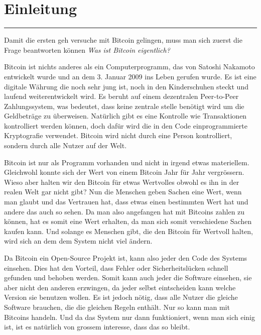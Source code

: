 \vspace*{1mm}
\section*{Einleitung}
\vspace{-10mm}
\noindent\rule{0.8\textwidth}{0.4pt}

\vspace{5mm}

\noindent
Damit die ersten geh versuche mit Bitcoin gelingen, muss man sich zuerst die Frage beantworten können \emph{\dq Was ist Bitcoin eigentlich? \dq}

\noindent
Bitcoin ist nichts anderes als ein Computerprogramm, das von Satoshi Nakamoto entwickelt wurde und an dem 3. Januar 2009 ins Leben gerufen wurde.
Es ist eine digitale Währung die noch sehr jung ist, noch in den Kinderschuhen steckt und laufend weiterentwickelt wird.
Es beruht auf einem dezentralen Peer-to-Peer Zahlungssystem, was bedeutet, dass keine zentrale stelle benötigt wird um die Geldbeträge zu überweisen.
Natürlich gibt es eine Kontrolle wie Transaktionen kontrolliert werden können, doch dafür wird die in den Code einprogrammierte Kryptografie verwendet.
Bitcoin wird nicht durch eine Person kontrolliert, sondern durch alle Nutzer auf der Welt.

\noindent
Bitcoin ist nur als Programm vorhanden und nicht in irgend etwas materiellem. Gleichwohl konnte sich der Wert von einem Bitcoin Jahr für Jahr vergrössern.
Wieso aber halten wir den Bitcoin für etwas Wertvolles obwohl es ihn in der realen Welt gar nicht gibt? Nun die Menschen geben Sachen eine Wert, wenn
man glaubt und das Vertrauen hat, dass etwas einen bestimmten Wert hat und andere das auch so sehen. Da man also angefangen hat mit Bitcoins zahlen zu können,
hat es somit eine Wert erhalten, da man sich somit verschiedene Sachen kaufen kann. Und solange es Menschen gibt, die den Bitcoin für Wertvoll halten, wird sich
an dem dem System nicht viel ändern.

\noindent
Da Bitcoin ein Open-Source Projekt ist, kann also jeder den Code des Systems einsehen. Dies hat den Vorteil, dass Fehler oder Sicherheitslücken schnell
gefunden und behoben werden. Somit kann auch jeder die Software einsehen, sie aber nicht den anderen erzwingen, da jeder selbst eintscheiden kann welche
Version sie benutzen wollen. Es ist jedoch nötig, dass alle Nutzer die gleiche Software brauchen, die die gleichen Regeln enthält. Nur so kann man mit
Bitcoins handeln. Und da das System nur dann funktioniert, wenn man sich einig ist, ist es natürlich von grossem interesse, dass das so bleibt.

